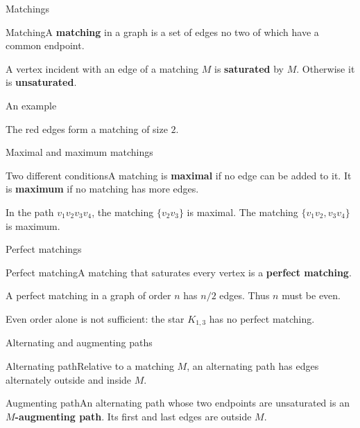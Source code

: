 \documentclass[aspectratio=169,11pt]{beamer}
\newcommand{\Def}[2]{\begin{block}{#1}#2\end{block}}
\newcommand{\gap}{\par\medskip}
\begin{document}
\begin{frame}{Matchings}
\large
\Def{Matching}{A \textbf{matching} in a graph is a set of edges no two of which have a common endpoint.}
\gap A vertex incident with an edge of a matching $M$ is \textbf{saturated} by $M$. Otherwise it is \textbf{unsaturated}.
\end{frame}
\begin{frame}{An example}
\large
\begin{center}\end{center}
\begin{center}The red edges form a matching of size $2$.\end{center}
\end{frame}
\begin{frame}{Maximal and maximum matchings}
\large
\Def{Two different conditions}{A matching is \textbf{maximal} if no edge can be added to it. It is \textbf{maximum} if no matching has more edges.}
\gap In the path $v_1v_2v_3v_4$, the matching $\{v_2v_3\}$ is maximal. The matching $\{v_1v_2,v_3v_4\}$ is maximum.
\end{frame}
\begin{frame}{Perfect matchings}
\large
\Def{Perfect matching}{A matching that saturates every vertex is a \textbf{perfect matching}.}
\gap A perfect matching in a graph of order $n$ has $n/2$ edges. Thus $n$ must be even.
\gap Even order alone is not sufficient: the star $K_{1,3}$ has no perfect matching.
\end{frame}
\begin{frame}{Alternating and augmenting paths}
\large
\Def{Alternating path}{Relative to a matching $M$, an alternating path has edges alternately outside and inside $M$.}
\Def{Augmenting path}{An alternating path whose two endpoints are unsaturated is an \textbf{$M$-augmenting path}. Its first and last edges are outside $M$.}
\end{frame}
\end{document}
